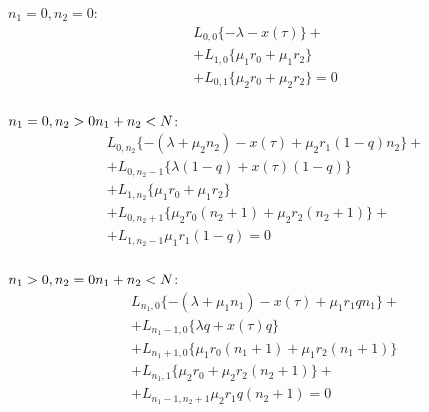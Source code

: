 $n_{1}=0, n_{2}=0$:\\
\begin{equation}\label{rEquationLong0}
	\begin{split}
		&L_{0, 0}\{-\lambda - x(\tau)\}+\\
		&+L_{1 , 0}\{\mu_{1} r_{0}+ \mu_{1} r_{2}\}\\
		&+L_{0, 1 }\{ \mu_{2} r_{0}  + \mu_{2} r_{2}\}=0\\
	\end{split}
\end{equation}

$n_{1}=0, n_{2} > 0\\
n_{1}+n_{2}< N$:\\
\begin{equation}\label{rEquationLong1}
	\begin{split}
		&L_{0, n_{2}}\{-(\lambda+\mu_{2}n_{2}) - x(\tau)+  \mu_{2}r_{1}(1-q)n_{2}\}+\\
		&+L_{0, n_{2}-1}\{\lambda (1-q) + x(\tau) (1-q) \}\\
		&+L_{1 , n_{2}}\{\mu_{1} r_{0} + \mu_{1} r_{2} \}\\
		&+L_{0, n_{2} + 1 }\{ \mu_{2} r_{0} (n_{2}+1) + \mu_{2} r_{2} (n_{2}+1)\}+\\
		&+L_{1 , n_{2}-1}\mu_{1} r_{1}(1-q) =0\\
	\end{split}
\end{equation}

$n_{1}>0, n_{2} = 0\\
n_{1}+n_{2}< N$:\\
\begin{equation}\label{rEquationLong2}
	\begin{split}
		&L_{n_{1},0}\{-(\lambda+\mu_{1}n_{1}) - x(\tau) + \mu_{1}r_{1}qn_{1}\}+\\
		&+L_{n_{1}-1, 0}\{\lambda q+ x(\tau) q  \}\\
		&+L_{n_{1} +1 , 0}\{ \mu_{1} r_{0}(n_{1}+1) + \mu_{1} r_{2} (n_{1}+1)\}\\
		&+L_{n_{1}, 1 }\{ \mu_{2} r_{0}  + \mu_{2} r_{2} (n_{2}+1)\}+\\
		&+L_{n_{1} -1 , n_{2}+1}\mu_{2} r_{1}q(n_{2}+1) =0
	\end{split}
\end{equation}

